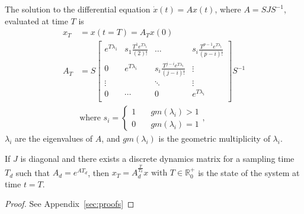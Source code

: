 \documentclass[sigconf]{llncs}
\newcommand{\mat}[1]{{#1}}
\renewcommand{\vec}[1]{{#1}}
\begin{document}
 \begin{theorem}
 The solution to the differential equation $\dot{\vec{x}}(t)=\mat{A}\vec{x}(t)$, where $\mat{A}=\mat{S}\mat{J}\mat{S}^{-1}$,
 evaluated at time $T$ is
 \begin{align}
 \vec{x}_T&=\vec{x}(t=T)=\mat{A}_{T}\vec{x} (0)\\
 \mat{A}_{T}&= \mat{S}
 \left [ \begin{array}{cccc}
 e^{T\lambda_1}  & s_1\frac{T^{1}e^{T\lambda_i}}{(2)!} & \hdots  & s_i\frac{T^{p-1}e^{T\lambda_i}}{(p-i)!} \\
0 & e^{T\lambda_i}  & s_i\frac{T^{j-i}e^{T\lambda_i}}{(j-i)!} & \vdots \\
\vdots & & \ddots & \vdots \\
0 & \cdots & 0  &e^{T\lambda_i} \\
\end{array} \right ]
 \mat{S}^{-1}
 \label{eq:continuous_tube_dyn2}\\
 &\text{where } s_i=\left\{\begin{array}{cc}1&\quad gm(\lambda_i)>1\\0&\quad gm(\lambda_i)=1\end{array}\right.,\nonumber
 \end{align}
$\lambda_i$ are the eigenvalues of $\mat{A}$, and $gm(\lambda_i)$ is the geometric multiplicity of $\lambda_i$.  
 \end{theorem}
 \begin{corollary}
 If $\mat{J}$ is diagonal and there exists a discrete dynamics matrix for a sampling time $T_d$ such that $A_d=e^{\mat{A} T_d}$, then $\vec{x}_T=A_d^{\frac{T}{T_d}}\vec{x} \text{ with } T \in \mathbb{R}^+_0$ is the state of the system at time $t=T$.
 \end{corollary}
\begin{proof}
See Appendix~\ref{sec:proofs}
\end{proof}
\end{document}
